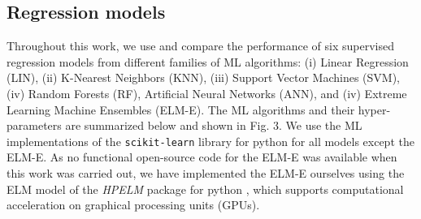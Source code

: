 \subsection{Regression models}
\label{ML_models}
\label{RF}
Throughout this work, we use and compare the performance of six supervised regression models from different families of ML algorithms: (i) Linear Regression (LIN), (ii) K-Nearest Neighbors (KNN), (iii) Support Vector Machines (SVM), (iv) Random Forests (RF), Artificial Neural Networks (ANN), and (iv) Extreme Learning Machine Ensembles (ELM-E).
The ML algorithms and their hyper-parameters are summarized below and shown in Fig. 3. 
We use the ML implementations of the \texttt{scikit-learn} library for python \cite{pedregosa_scikit-learn:_2011} for all models except the ELM-E. As no functional open-source code for the ELM-E was available when this work was carried out, we have implemented the ELM-E ourselves using the ELM model of the \textit{HPELM} package for python \cite{akusok_high-performance_2015}, which supports computational acceleration on graphical processing units (GPUs).


